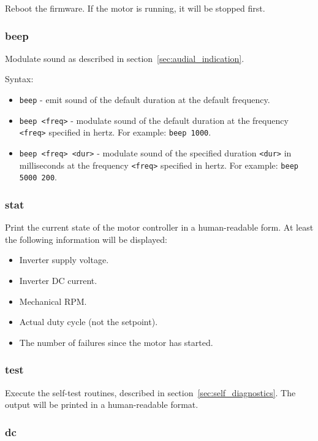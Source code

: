 \documentclass{zubaxdoc}
\begin{document}
	Reboot the firmware.
	If the motor is running, it will be stopped first.
	
	\subsubsection{beep}
	
	Modulate sound as described in section~\ref{sec:audial_indication}.
	
	Syntax:
	\begin{itemize}
		\item \verb|beep| - emit sound of the default duration at the default frequency.
		\item \verb|beep <freq>| - modulate sound of the default duration at the frequency \verb|<freq>|
		specified in hertz. For example: \verb|beep 1000|.
		\item \verb|beep <freq> <dur>| - modulate sound of the specified duration \verb|<dur>| in milliseconds
		at the frequency \verb|<freq>| specified in hertz. For example: \verb|beep 5000 200|.
	\end{itemize}
	
	\subsubsection{stat}
	
	Print the current state of the motor controller in a human-readable form.
	At least the following information will be displayed:
	\begin{itemize}
		\item Inverter supply voltage.
		\item Inverter DC current.
		\item Mechanical RPM.
		\item Actual duty cycle (not the setpoint).
		\item The number of failures since the motor has started.
	\end{itemize}
	
	\subsubsection{test}
	
	Execute the self-test routines, described in section~\ref{sec:self_diagnostics}.
	The output will be printed in a human-readable format.
	
	\subsubsection{dc}
	
\end{document}
